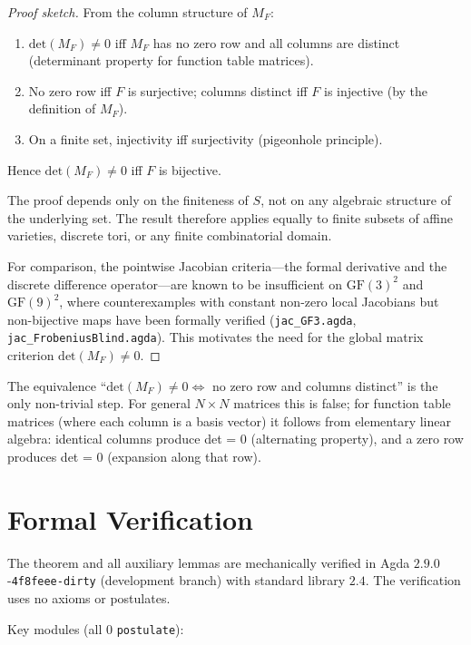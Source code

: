 \documentclass[a4paper,11pt]{article}
\theoremstyle{definition}
\theoremstyle{remark}
\newcommand{\GF}{\mathrm{GF}}
\newcommand{\MF}{M_F}
\newcommand{\Det}{\mathrm{det}}
\begin{document}
\begin{proof}[Proof sketch]
From the column structure of $\MF$:
\begin{enumerate}
\item $\Det(\MF)\neq 0$ iff $\MF$ has no zero row and all columns are
distinct (determinant property for function table matrices).
\item No zero row iff $F$ is surjective; columns distinct iff $F$ is injective
(by the definition of $\MF$).
\item On a finite set, injectivity iff surjectivity (pigeonhole principle).
\end{enumerate}
Hence $\Det(\MF)\neq 0$ iff $F$ is bijective.

The proof depends only on the finiteness of $S$, not on any algebraic
structure of the underlying set. The result therefore applies equally to
finite subsets of affine varieties, discrete tori, or any finite
combinatorial domain.

For comparison, the pointwise Jacobian criteria---the formal derivative
and the discrete difference operator---are known to be insufficient on
$\GF(3)^2$ and $\GF(9)^2$, where counterexamples with constant non-zero
local Jacobians but non-bijective maps have been formally verified
(\texttt{jac\_GF3.agda}, \texttt{jac\_FrobeniusBlind.agda}). This
motivates the need for the global matrix criterion $\Det(\MF)\neq 0$.
\end{proof}

The equivalence ``$\Det(\MF)\neq 0 \iff$ no zero row and columns distinct''
is the only non-trivial step. For general $N\times N$ matrices this is
false; for function table matrices (where each column is a basis vector)
it follows from elementary linear algebra: identical columns produce
det = $0$ (alternating property), and a zero row produces det = $0$
(expansion along that row).

\section{Formal Verification}

The theorem and all auxiliary lemmas are mechanically verified in
Agda $2.9.0$-\texttt{4f8feee-dirty} (development branch) with
standard library $2.4$. The verification uses no axioms or postulates.

Key modules (all $0$ \texttt{postulate}):
\end{document}
